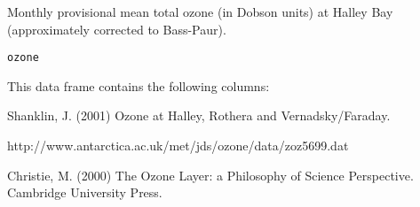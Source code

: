 \begin{Description}\relax
Monthly provisional mean total ozone (in Dobson units) at Halley Bay 
(approximately corrected to Bass-Paur).
\end{Description}
\begin{Usage}
\begin{verbatim}ozone\end{verbatim}
\end{Usage}
\begin{Format}\relax
This data frame contains the following columns:
\end{Format}
\begin{Source}\relax
Shanklin, J. (2001) Ozone at Halley, Rothera and Vernadsky/Faraday.  

http://www.antarctica.ac.uk/met/jds/ozone/data/zoz5699.dat
\end{Source}
\begin{References}\relax
Christie, M. (2000) The Ozone Layer: a Philosophy of Science Perspective.
Cambridge University Press.
\end{References}
\begin{Examples}
\end{Examples}

